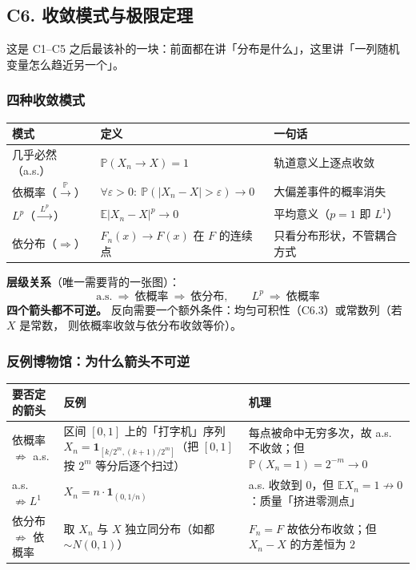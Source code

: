 \subsection{C6. 收敛模式与极限定理}
\label{subsec:convergence-modes}

这是 C1--C5 之后最该补的一块：前面都在讲「分布是什么」，这里讲「一列随机变量怎么趋近另一个」。

\subsubsection{四种收敛模式}

\begin{center}
\begin{tabular}{L{2.6cm}L{5.6cm}L{6.4cm}}
\toprule
\textbf{模式} & \textbf{定义} & \textbf{一句话} \\
\midrule
几乎必然（a.s.） & $\mathbb P(X_n\to X)=1$ & 轨道意义上逐点收敛 \\
依概率（$\xrightarrow{\ \mathbb P\ }$） & $\forall\varepsilon>0:\ \mathbb P(|X_n-X|>\varepsilon)\to0$ &
大偏差事件的概率消失 \\
$L^p$（$\xrightarrow{\ L^p\ }$） & $\mathbb E|X_n-X|^p\to0$ & 平均意义（$p=1$ 即 $L^1$） \\
依分布（$\Rightarrow$） & $F_n(x)\to F(x)$ 在 $F$ 的连续点 & 只看分布形状，不管耦合方式 \\
\bottomrule
\end{tabular}
\end{center}

\textbf{层级关系}（唯一需要背的一张图）：
\[
\text{a.s.}\ \Longrightarrow\ \text{依概率}\ \Longrightarrow\ \text{依分布},
\qquad
L^p\ \Longrightarrow\ \text{依概率}
\]
\textbf{四个箭头都不可逆。} 反向需要一个额外条件：均匀可积性（C6.3）或常数列（若 $X$ 是常数，
则依概率收敛与依分布收敛等价）。

\subsubsection{反例博物馆：为什么箭头不可逆}

\begin{center}
\begin{tabular}{L{3.4cm}L{5.2cm}L{5.6cm}}
\toprule
\textbf{要否定的箭头} & \textbf{反例} & \textbf{机理} \\
\midrule
依概率 $\not\Rightarrow$ a.s. & 区间 $[0,1]$ 上的「打字机」序列
$X_n=\mathbf 1_{[k/2^m,(k+1)/2^m]}$（把 $[0,1]$ 按 $2^m$ 等分后逐个扫过） &
每点被命中无穷多次，故 a.s. 不收敛；但 $\mathbb P(X_n=1)=2^{-m}\to0$ \\
\addlinespace
a.s. $\not\Rightarrow L^1$ & $X_n=n\cdot\mathbf 1_{(0,1/n)}$ &
a.s. 收敛到 $0$，但 $\mathbb E X_n=1\not\to0$：质量「挤进零测点」 \\
\addlinespace
依分布 $\not\Rightarrow$ 依概率 & 取 $X_n$ 与 $X$ 独立同分布（如都 $\sim N(0,1)$） &
$F_n=F$ 故依分布收敛；但 $X_n-X$ 的方差恒为 $2$ \\
\bottomrule
\end{tabular}
\end{center}

